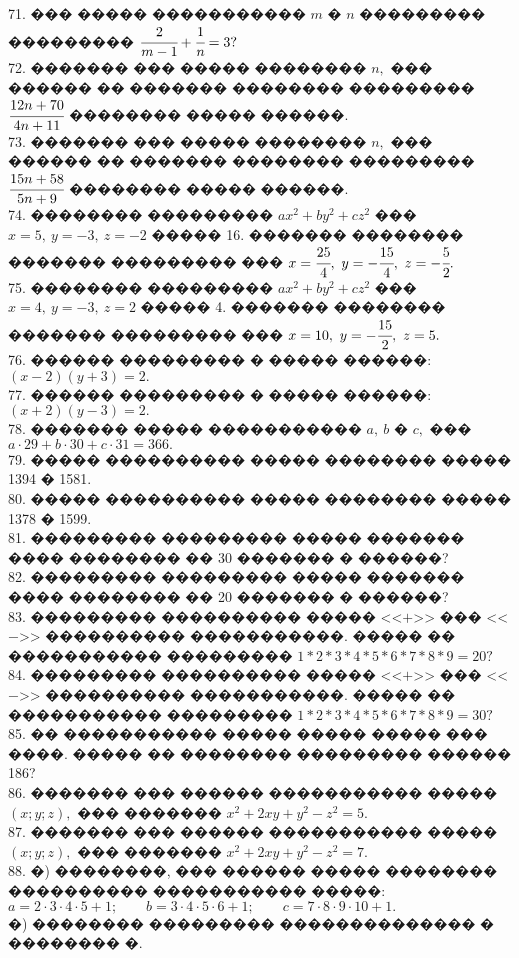 \documentclass[12pt]{article}
\begin{document}
71. ��� ����� ����������� $m$ � $n$ ��������� ��������� $\cfrac{2}{m-1}+\cfrac{1}{n}=3?$\\
72. ������� ��� ����� �������� $n,$ ��� ������ �� ������� �������� ��������� $\cfrac{12n+70}{4n+11}$ �������� ����� ������.\\
73. ������� ��� ����� �������� $n,$ ��� ������ �� ������� �������� ��������� $\cfrac{15n+58}{5n+9}$ �������� ����� ������.\\
74. �������� ��������� $ax^2+by^2+cz^2$ ��� $x=5,\ y=-3,\ z=-2$ ����� 16. ������� �������� ������� ��������� ��� $x=\cfrac{25}{4},\ y=-\cfrac{15}{4},\ z=-\cfrac{5}{2}.$\\
75. �������� ��������� $ax^2+by^2+cz^2$ ��� $x=4,\ y=-3,\ z=2$ ����� 4. ������� �������� ������� ��������� ��� $x=10,\ y=-\cfrac{15}{2},\ z=5.$\\
76. ������ ��������� � ����� ������: $(x-2)(y+3)=2.$\\
77. ������ ��������� � ����� ������: $(x+2)(y-3)=2.$\\
78. ������� ����� ����������� $a,\ b$ � $c,$ ��� $a\cdot29+b\cdot30+c\cdot31=366.$\\
79. ����� ���������� ����� �������� ����� 1394 � 1581.\\
80. ����� ���������� ����� �������� ����� 1378 � 1599.\\
81. ��������� ��������� ����� ������� ���� �������� �� 30 ������� � ������?\\
82. ��������� ��������� ����� ������� ���� �������� �� 20 ������� � ������?\\
83. ��������� ���������� ����� <<$+$>> ��� <<$-$>> ���������� �����������. ����� �� ����������� ��������� $1*2*3*4*5*6*7*8*9=20?$\\
84. ��������� ���������� ����� <<$+$>> ��� <<$-$>> ���������� �����������. ����� �� ����������� ��������� $1*2*3*4*5*6*7*8*9=30?$\\
85. �� ����������� ����� ����� ����� ��� ����. ����� �� �������� ��������� ������ 186?\\
86. ������� ��� ������ ����������� ����� $(x;y;z),$ ��� ������� $x^2+2xy+y^2-z^2=5.$\\
87. ������� ��� ������ ����������� ����� $(x;y;z),$ ��� ������� $x^2+2xy+y^2-z^2=7.$\\
88. �) ��������, ��� ������ ����� �������� ���������� ����������� �����:\\
$a=2\cdot3\cdot4\cdot5+1;\qquad b=3\cdot4\cdot5\cdot6+1;\qquad c=7\cdot8\cdot9\cdot10+1.$\\
�) �������� ��������� �������������� � �������� �.\\
\end{document}
